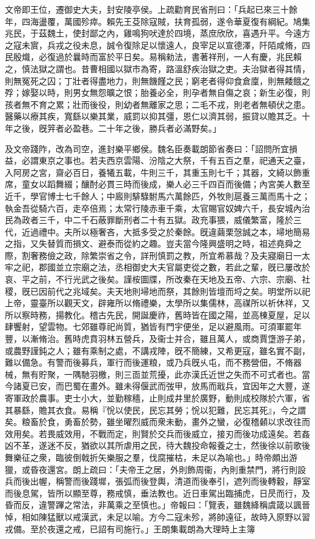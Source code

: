 \begin{pinyinscope}
文帝即王位，遷御史大夫，封安陵亭侯。上疏勸育民省刑曰：「兵起已來三十餘年，四海盪覆，萬國殄瘁。賴先王芟除寇賊，扶育孤弱，遂令華夏復有綱紀。鳩集兆民，于茲魏土，使封鄙之內，雞鳴狗吠達於四境，蒸庶欣欣，喜遇升平。今遠方之寇未賔，兵戎之役未息，誠令復除足以懷遠人，良宰足以宣德澤，阡陌咸脩，四民殷熾，必復過於曩時而富於平日矣。易稱勑法，書著祥刑，一人有慶，兆民賴之，慎法獄之謂也。昔曹相國以獄市為寄，路溫舒疾治獄之吏。夫治獄者得其情，則無冤死之囚；丁壯者得盡地力，則無饑饉之民；窮老者得仰食倉廩，則無餧餓之殍；嫁娶以時，則男女無怨曠之恨；胎養必全，則孕者無自傷之哀；新生必復，則孩者無不育之累；壯而後役，則幼者無離家之思；二毛不戎，則老者無頓伏之患。醫藥以療其疾，寬繇以樂其業，威罰以抑其彊，恩仁以濟其弱，振貸以贍其乏。十年之後，旣笄者必盈巷。二十年之後，勝兵者必滿野矣。」

及文帝踐阼，改為司空，進封樂平鄉侯。魏名臣奏載朗節省奏曰：「詔問所宜損益，必謂東京之事也。若夫西京雲陽、汾陰之大祭，千有五百之羣，祀通天之臺，入阿房之宮，齋必百日，養犧五載，牛則三千，其重玉則七千；其器，文綺以飾重席，童女以蹈舞綴；釀酎必貫三時而後成，樂人必三千四百而後備；內宮美人數至近千，學官博士七千餘人；中廄則騑騄駙馬六萬餘匹，外牧則扈養三萬而馬十之；執金吾從騎六百，走卒倍焉；太常行陵赤車千乘，太官賜官奴婢六千，長安城內治民為政者三千，中二千石蔽罪斷刑者二十有五獄。政充事猥，威儀繁富，隆於三代，近過禮中。夫所以極奢吝，大抵多受之於秦餘。旣違繭栗愨誠之本，埽地簡易之指，又失替質而損文、避泰而從約之趣。豈夫當今隆興盛明之時，祖述堯舜之際，割奢務儉之政，除繁崇省之令，詳刑慎罰之教，所宜希慕哉？及夫寢廟日一太牢之祀，郡國並立宗廟之法，丞相御史大夫官屬吏從之數，若此之輩，旣已屢改於哀、平之前，不行光武之後矣。謹桉圖牒，所改秦在天地及五帝、六宗、宗廟、社稷，旣已因前代之兆域矣。夫天地則埽地而祭，其餘則皆壇而埒之矣。明堂所以祀上帝，靈臺所以觀天文，辟雍所以脩禮樂，太學所以集儒林，高禖所以祈休祥，又所以察時務，揚教化。稽古先民，開誕慶祚，舊時皆在國之陽，並高棟夏屋，足以肆饗射，望雲物。七郊雖尊祀尚質，猶皆有門宇便坐，足以避風雨。可須軍罷年豐，以漸脩治。舊時虎賁羽林五營兵，及衞士并合，雖且萬人，或商賈墯游子弟，或農野謹鈍之人；雖有乘制之處，不講戎陣，旣不簡練，又希更寇，雖名實不副，難以備急。有警而後募兵，軍行而後運粮，或乃兵旣乆屯，而不務營佃，不脩器械，無有貯聚，一隅馳羽檄，則三靣並荒擾，此亦漢氏近世之失而不可式者也。當今諸夏已安，而巴蜀在畫外。雖未得偃武而弢甲，放馬而戢兵，宜因年之大豐，遂寄軍政於農事。吏士小大，並勤稼穡，止則成井里於廣野，動則成校隊於六軍，省其暴繇，贍其衣食。易稱『恱以使民，民忘其勞；恱以犯難，民忘其死』，今之謂矣。粮畜於食，勇畜於勢，雖坐曜烈威而衆未動，畫外之蠻，必復稽顙以求改往而效用矣。若畏威效用，不戰而定，則賢於交兵而後威立，接刃而後功成遠矣。若姦凶不革，遂迷不反，猶欲以其所虐用之民，待大魏投命報養之士，然後徐以前歌後舞樂征之衆，臨彼倒戟折矢樂服之羣，伐腐摧枯，未足以為喻也。」時帝頗出游獵，或昏夜還宮。朗上疏曰：「夫帝王之居，外則飾周衞，內則重禁門，將行則設兵而後出幄，稱警而後踐墀，張弧而後登輿，清道而後奉引，遮列而後轉轂，靜室而後息駕，皆所以顯至尊，務戒慎，垂法教也。近日車駕出臨捕虎，日昃而行，及昏而反，違警蹕之常法，非萬乘之至慎也。」帝報曰：「覽表，雖魏絳稱虞箴以諷晉悼，相如陳猛獸以戒漢武，未足以喻。方今二寇未殄，將帥遠征，故時入原野以習戎備。至於夜還之戒，已詔有司施行。」王朗集載朗為大理時上主簿
\end{pinyinscope}
